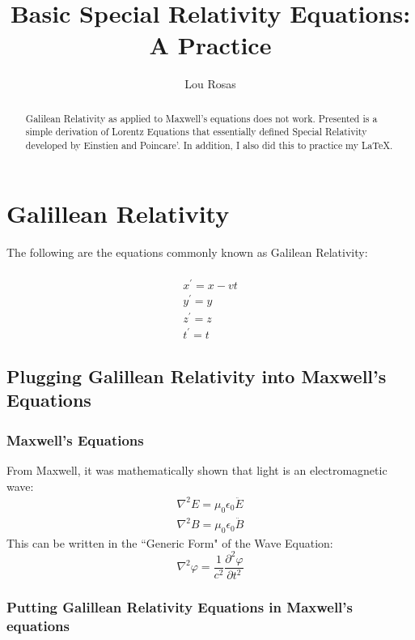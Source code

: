 \documentclass[journal]{IEEEtran}
\begin{document}
\title{Basic Special Relativity Equations:  A Practice}
\author{Lou Rosas}
\maketitle

\begin{abstract}
Galilean Relativity as applied to Maxwell's equations does not work.
Presented is a simple derivation of Lorentz Equations that
essentially defined Special Relativity developed by Einstien and
Poincare'.  In addition, I also did this to practice my
\LaTeX.
\end{abstract}
\section{Galillean Relativity}
The following are the equations commonly known as Galilean
Relativity:\\\\
\begin{eqnarray}
x^\prime = x-vt\\
y^\prime = y\\
z^\prime = z\\
t^\prime = t
\end{eqnarray}
\subsection{Plugging Galillean Relativity into Maxwell's Equations}
\subsubsection{Maxwell's Equations}
From Maxwell, it was mathematically shown that light is an
electromagnetic wave:
\begin{eqnarray}
\nabla^2E=\mu_0\epsilon_0\ddot{E}\\
\nabla^2B=\mu_0\epsilon_0\ddot{B}
\end{eqnarray}
This can be written in the ``Generic Form" of the Wave Equation:
\begin{equation}
\nabla^2\varphi=\frac{1}{c^2}\frac{\partial^2 \varphi}{\partial t^2}
\end{equation}
\subsubsection{Putting Galillean Relativity Equations in Maxwell's
equations}
\end{document}
